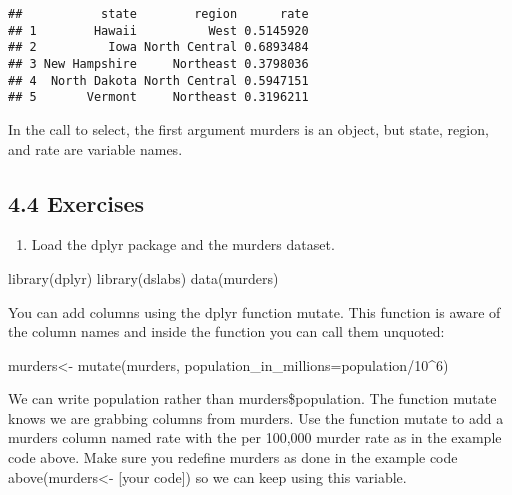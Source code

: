 \documentclass[
]{article}
\newenvironment{Shaded}{\begin{snugshade}}{\end{snugshade}}
\newcommand{\AttributeTok}[1]{\textcolor[rgb]{0.77,0.63,0.00}{#1}}
\newcommand{\DecValTok}[1]{\textcolor[rgb]{0.00,0.00,0.81}{#1}}
\newcommand{\FunctionTok}[1]{\textcolor[rgb]{0.00,0.00,0.00}{#1}}
\newcommand{\NormalTok}[1]{#1}
\newcommand{\OtherTok}[1]{\textcolor[rgb]{0.56,0.35,0.01}{#1}}
\newcommand{\SpecialCharTok}[1]{\textcolor[rgb]{0.00,0.00,0.00}{#1}}
\providecommand{\tightlist}{%
  \setlength{\itemsep}{0pt}\setlength{\parskip}{0pt}}
\begin{document}
\begin{verbatim}
##           state        region      rate
## 1        Hawaii          West 0.5145920
## 2          Iowa North Central 0.6893484
## 3 New Hampshire     Northeast 0.3798036
## 4  North Dakota North Central 0.5947151
## 5       Vermont     Northeast 0.3196211
\end{verbatim}

In the call to select, the first argument murders is an object, but
state, region, and rate are variable names.

\hypertarget{exercises-1}{%
\subsection{4.4 Exercises}\label{exercises-1}}

\begin{enumerate}
\def\labelenumi{\arabic{enumi}.}
\tightlist
\item
  Load the dplyr package and the murders dataset.
\end{enumerate}

\begin{Shaded}
\begin{Highlighting}[]
\FunctionTok{library}\NormalTok{(dplyr)}
\FunctionTok{library}\NormalTok{(dslabs)}
\FunctionTok{data}\NormalTok{(murders)}
\end{Highlighting}
\end{Shaded}

You can add columns using the dplyr function mutate. This function is
aware of the column names and inside the function you can call them
unquoted:

\begin{Shaded}
\begin{Highlighting}[]
\NormalTok{murders}\OtherTok{\textless{}{-}} \FunctionTok{mutate}\NormalTok{(murders, }\AttributeTok{population\_in\_millions=}\NormalTok{population}\SpecialCharTok{/}\DecValTok{10}\SpecialCharTok{\^{}}\DecValTok{6}\NormalTok{)}
\end{Highlighting}
\end{Shaded}

We can write population rather than murders\$population. The function
mutate knows we are grabbing columns from murders. Use the function
mutate to add a murders column named rate with the per 100,000 murder
rate as in the example code above. Make sure you redefine murders as
done in the example code above(murders\textless- {[}your code{]}) so we
can keep using this variable.
\end{document}
